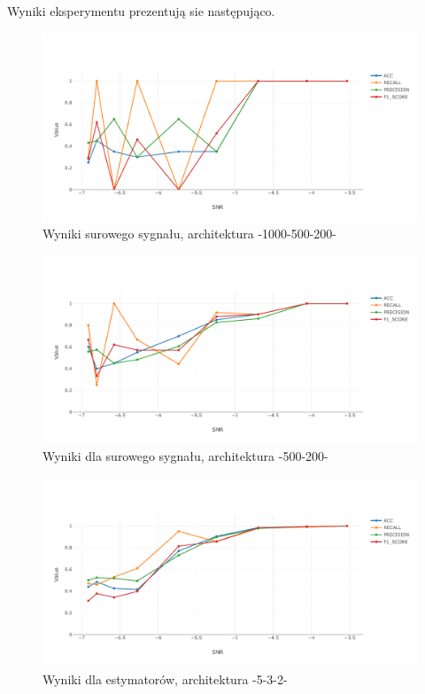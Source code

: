 \documentclass[inzynierska]{pwr_wmat_praca_dyplomowa}
\theoremstyle{plain}
\numberwithin{theorem}{chapter}
\theoremstyle{definition}
\numberwithin{theorem}{chapter}
\begin{document}
Wyniki eksperymentu prezentują sie następująco.


\begin{figure}[ht]
	\centering
	\includegraphics[width=14cm]{images/nn_full_1000_500_200.pdf}
	\caption{Wyniki surowego sygnału, architektura -1000-500-200-}
	\label{wynik-sur-1000-500-200}
\end{figure}

\begin{figure}[ht]
	\centering
	\includegraphics[width=14cm]{images/nn_full_signal_500_200.pdf}
	\caption{Wyniki dla surowego sygnału, architektura -500-200-}
	\label{wynik-sur-500-200}
\end{figure}

\begin{figure}[H]
	\centering
	\includegraphics[width=14cm]{images/nn_small_532.pdf}
	\caption{Wyniki dla estymatorów, architektura -5-3-2-}
	\label{wynik-est-5-3-2}
\end{figure}
\end{document}
